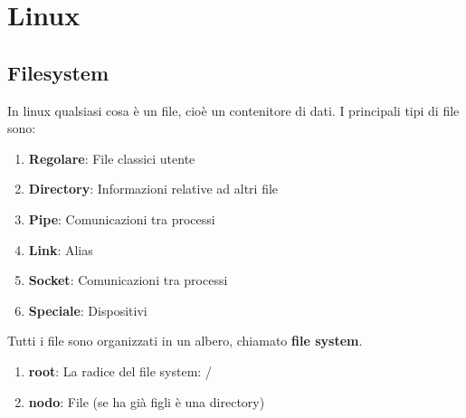 \documentclass[a4paper]{article}
\theoremstyle{break}
\theoremstyle{break}
\theoremstyle{break}
\theoremstyle{break}
\begin{document}
\section{Linux}
\subsection{Filesystem}
In linux qualsiasi cosa è un file, cioè un contenitore di dati. I principali
tipi di file sono:
\begin{enumerate}
  \item \textbf{Regolare}: File classici utente
  \item \textbf{Directory}: Informazioni relative ad altri file
  \item \textbf{Pipe}: Comunicazioni tra processi
  \item \textbf{Link}: Alias
  \item \textbf{Socket}: Comunicazioni tra processi
  \item \textbf{Speciale}: Dispositivi
\end{enumerate}

\noindent Tutti i file sono organizzati in un albero, chiamato \textbf{file system}.
\begin{enumerate}
  \item \textbf{root}: La radice del file system: /
  \item \textbf{nodo}: File (se ha già figli è una directory)
\end{enumerate}
\end{document}
